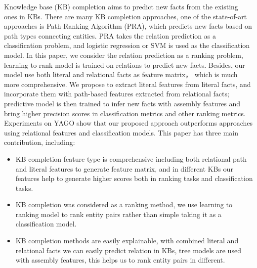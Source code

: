 
\begin{eabstract}
Knowledge base (KB) completion aims to predict new facts
from the existing ones in KBs. There are many KB completion approaches,
one of the state-of-art approaches is Path Ranking Algorithm
(PRA), which predicts new facts based on path types connecting entities.
PRA takes the relation prediction as a classification problem, and
logistic regression or SVM is used as the classification model. In this paper, we
consider the relation prediction as a ranking problem, learning to rank
model is trained on relations to predict new facts. Besides, our model
use both literal and relational facts as feature matrix， which is much more comprehensive. We propose to extract literal features from literal facts, and incorporate them with path-based
features extracted from relational facts; predictive
model is then trained to infer new
facts with assembly features and bring higher precision scores in classification metrics and other ranking metrics. Experiments on YAGO show that our proposed approach outperforms approaches using relational features and classification models.
This paper has three main contribution, including:
\begin{itemize}[$\bullet$]
    \item KB completion feature type is comprehensive including both relational path and literal features to generate feature matrix, and in different KBs our features help to generate higher scores both in ranking tasks and classification tasks.
    \item KB completion was considered as a ranking method, we use learning to ranking model to rank entity pairs rather than simple taking it as a classification model.
    \item KB completion methods are easily explainable, with combined literal and relational facts we can easily predict relation in KBs, tree models are used with assembly features, this helps us to rank entity pairs in different.
  \end{itemize}

\end{eabstract}

